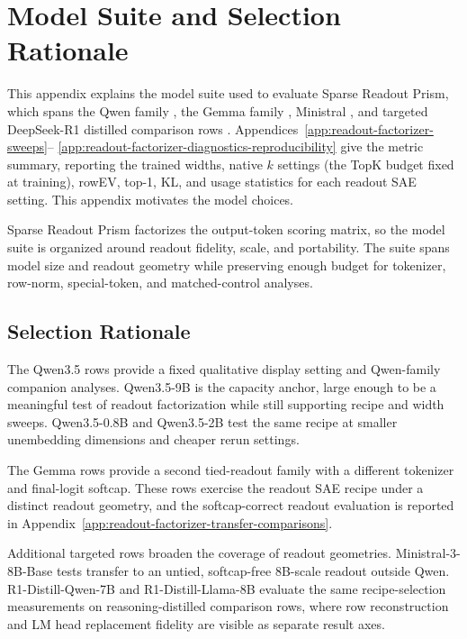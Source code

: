 \section{Model Suite and Selection Rationale}
\label{app:model-suite-selection}
\label{sec:app-model-suite-selection}

This appendix explains the model suite used to evaluate Sparse Readout Prism,
which spans the Qwen family \citep{qwen3technical,qwen35collection}, the Gemma
family \citep{gemma4official,gemma4collection}, Ministral
\citep{liu2026ministral3}, and targeted DeepSeek-R1 distilled comparison rows
\citep{deepseekai2025deepseekr1}.
Appendices~\ref{app:readout-factorizer-sweeps}--%
\ref{app:readout-factorizer-diagnostics-reproducibility} give the metric
summary, reporting the trained widths, native $k$ settings (the TopK budget
fixed at training), rowEV, top-1, KL,
and usage statistics for each readout SAE setting. This appendix motivates the
model choices.

Sparse Readout Prism factorizes the output-token scoring matrix, so the model
suite is organized around readout fidelity, scale, and portability. The suite
spans model size and readout geometry while preserving enough budget for
tokenizer, row-norm, special-token, and matched-control analyses.

\subsection{Selection Rationale}
\label{sec:app-model-suite-criteria}

The Qwen3.5 rows provide a fixed qualitative display setting and Qwen-family
companion analyses. Qwen3.5-9B is the capacity anchor, large enough to be a
meaningful test of readout factorization while still supporting recipe and width sweeps.
Qwen3.5-0.8B and Qwen3.5-2B test the same recipe at smaller unembedding
dimensions and cheaper rerun settings.

The Gemma rows provide a second tied-readout family with a different tokenizer
and final-logit softcap. These rows exercise the readout SAE recipe under
a distinct readout geometry, and the softcap-correct readout evaluation is reported
in Appendix~\ref{app:readout-factorizer-transfer-comparisons}.

Additional targeted rows broaden the coverage of readout geometries.
Ministral-3-8B-Base tests transfer to an untied, softcap-free 8B-scale readout
outside Qwen. R1-Distill-Qwen-7B and R1-Distill-Llama-8B evaluate the same
recipe-selection measurements on reasoning-distilled comparison rows, where row
reconstruction and LM head replacement fidelity are visible as separate result axes.

